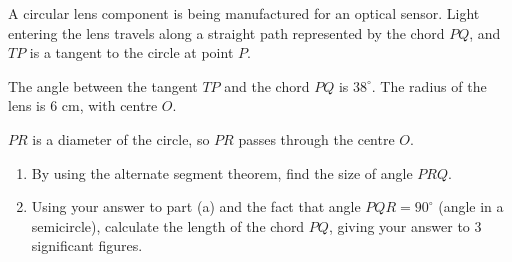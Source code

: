 \begin{question}
\noindent A circular lens component is being manufactured for an optical sensor. Light entering the lens travels along a straight path represented by the chord $PQ$, and $TP$ is a tangent to the circle at point $P$.

\noindent The angle between the tangent $TP$ and the chord $PQ$ is $38^\circ$. The radius of the lens is $6$ cm, with centre $O$.

\begin{center}
\end{center}

\noindent $PR$ is a diameter of the circle, so $PR$ passes through the centre $O$.

\begin{enumerate}
    \item[(a)] By using the alternate segment theorem, find the size of angle $PRQ$.
    \vspace{2.5cm}

    \item[(b)] Using your answer to part (a) and the fact that angle $PQR = 90^\circ$ (angle in a semicircle), calculate the length of the chord $PQ$, giving your answer to 3 significant figures.
    \vspace{4.5cm}
\end{enumerate}
\end{question}
